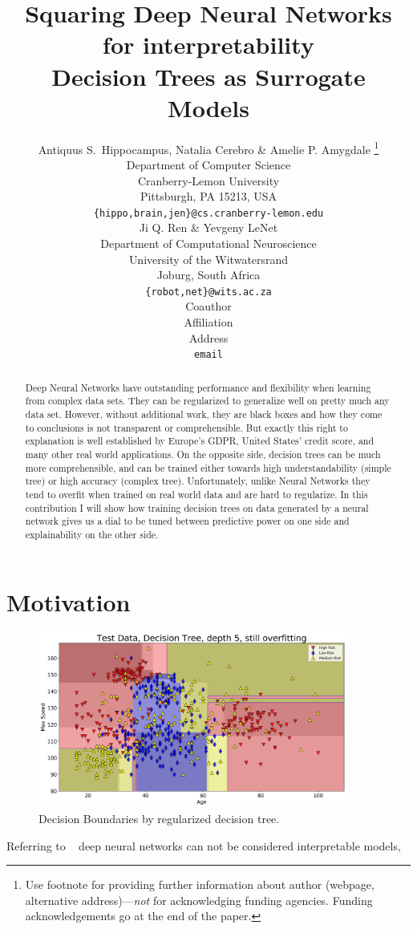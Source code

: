 \documentclass{article} %
\title{Squaring Deep Neural Networks for interpretability \\ Decision Trees as Surrogate Models}
\author{Antiquus S.~Hippocampus, Natalia Cerebro \& Amelie P. Amygdale \thanks{ Use footnote for providing further information
about author (webpage, alternative address)---\emph{not} for acknowledging
funding agencies.  Funding acknowledgements go at the end of the paper.} \\
Department of Computer Science\\
Cranberry-Lemon University\\
Pittsburgh, PA 15213, USA \\
\texttt{\{hippo,brain,jen\}@cs.cranberry-lemon.edu} \\
\And
Ji Q. Ren \& Yevgeny LeNet \\
Department of Computational Neuroscience \\
University of the Witwatersrand \\
Joburg, South Africa \\
\texttt{\{robot,net\}@wits.ac.za} \\
\AND
Coauthor \\
Affiliation \\
Address \\
\texttt{email}
}
\begin{document}
\maketitle

\begin{abstract}

Deep Neural Networks have outstanding performance and flexibility when learning from complex data sets. 
They can be regularized to generalize well on pretty much any data set. 
However, without additional work, they are black boxes and how they come to conclusions is not transparent or comprehensible. But exactly this right to explanation is well established by 
Europe's GDPR, United States' credit score, and
many other real world applications. On the opposite side, decision trees can be much more comprehensible, and can be trained either towards high understandability (simple tree) 
or high accuracy (complex tree). Unfortunately, unlike Neural Networks they tend to overfit when trained on real world data and are hard to regularize. In this contribution I will show how training decision trees on data generated by a neural network gives us a dial to be tuned between predictive power on one side and explainability on the other side.

\end{abstract}

\section{Motivation}

\begin{figure}[h]
\begin{center}
\includegraphics[width=4.0in]{dt-reg-all.png}
\end{center}
\caption{Decision Boundaries by regularized decision tree.}
\label{fig:dt_reg_bad}
\end{figure}

Referring to ~\citep{rudin2018stop} deep neural networks can not be considered interpretable models, 
\end{document}
